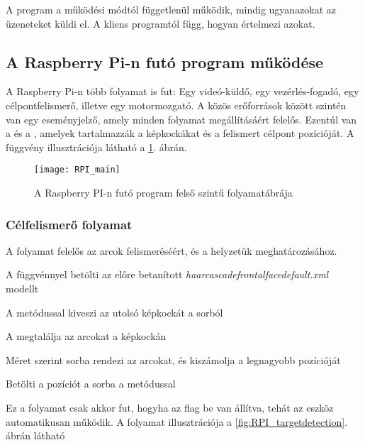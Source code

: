 A program a működési módtól függetlenül működik, mindig ugyanazokat az üzeneteket küldi el. A kliens programtól függ, hogyan értelmezi azokat.

\pagebreak

\subsection{A Raspberry Pi-n futó program működése}
A Raspberry Pi-n több folyamat is fut: Egy videó-küldő, egy vezérlés-fogadó, egy célpontfelismerő, illetve egy motormozgató. A közös erőforrások között szintén van egy  eseményjelző, amely minden folyamat megállításáért felelős. Ezentúl van a  és a , amelyek tartalmazzák a képkockákat és a felismert célpont pozícióját. A  függvény illusztrációja látható a \ref{fig:RPI_main}. ábrán.

\begin{figure}[h!]
	\centering
	\texttt{[image: RPI\_main]}
	\caption{A Raspberry PI-n futó program felső szintű folyamatábrája}
	\label{fig:RPI_main}
\end{figure}

\subsubsection*{Célfelismerő folyamat}

A  folyamat felelős az arcok felismeréséért, és a helyzetük meghatározásához.

\begin{list}{-}{}
	\item A  függvénnyel betölti az előre betanított \textsl{haarcascade\textunderscore frontalface\textunderscore default.xml} modellt
	\item A  metódussal kiveszi az utolsó képkockát a sorból
	\item A  megtalálja az arcokat a képkockán
	\item Méret szerint sorba rendezi az arcokat, és kiszámolja a legnagyobb pozícióját
	\item Betölti a pozíciót a sorba a  metódussal
\end{list}

Ez a folyamat csak akkor fut, hogyha az  flag be van állítva, tehát az eszköz automatikusan működik. A folyamat illusztrációja a \ref{fig:RPI_targetdetection}. ábrán látható

